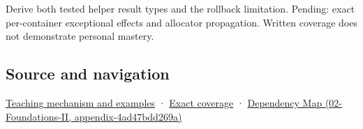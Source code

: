 Derive both tested helper result types and the rollback limitation. Pending: exact per-container exceptional effects and allocator propagation. Written coverage does not demonstrate personal mastery.

\subsection{Source and navigation}\label{appendix-c746afaa47d1-source-and-navigation}

\hyperref[01-foundations-i-ch003-failure-guarantees-shape-the-transfer-algorithm]{Teaching mechanism and examples} · \hyperref[appendix-fd090d982a15-m009---parts-127-147]{Exact coverage} · \href{../02-Foundations-II/main.pdf\#nameddest=appendix-4ad47bdd269a}{Dependency Map (02-Foundations-II, appendix-4ad47bdd269a)}
